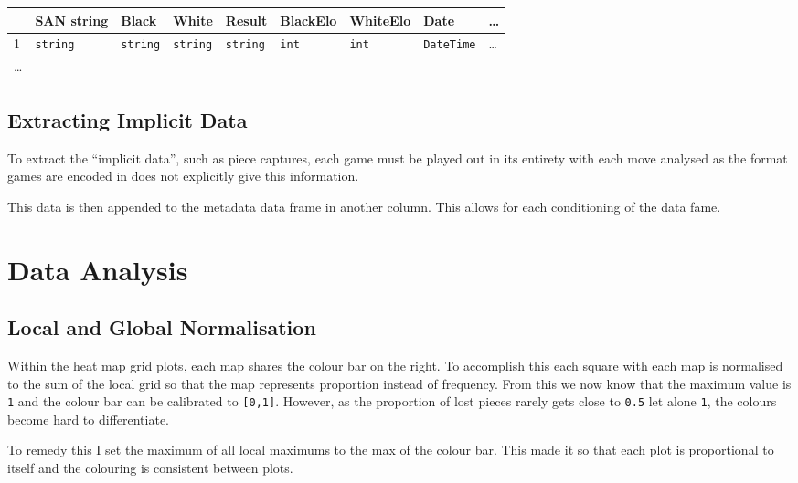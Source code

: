 \documentclass[11pt]{article}
\begin{document}
\begin{center}
\begin{tabular}{lllllllll}
 & SAN string & Black & White & Result & BlackElo & WhiteElo & Date & \ldots{}\\
\hline
1 & \texttt{string} & \texttt{string} & \texttt{string} & \texttt{string} & \texttt{int} & \texttt{int} & \texttt{DateTime} & \ldots{}\\
\ldots{} &  &  &  &  &  &  &  & \\
\end{tabular}
\end{center}

\subsection{Extracting Implicit Data}
\label{sec:org1444c4e}
To extract the ``implicit data'', such as piece captures, each game must be played out in its entirety with each move analysed as the format games are encoded in does not explicitly give this information.

This data is then appended to the metadata data frame in another column. This allows for each conditioning of the data fame.
\section{Data Analysis}
\label{sec:org4fd4c21}
\subsection{Local and Global Normalisation}
\label{sec:orgbfc8a85}
Within the heat map grid plots, each map shares the colour bar on the right. To accomplish this each square with each map is normalised to the sum of the local grid so that the map represents proportion instead of frequency. From this we now know that the maximum value is \texttt{1} and the colour bar can be calibrated to \texttt{[0,1]}. However, as the proportion of lost pieces rarely gets close to \texttt{0.5} let alone \texttt{1}, the colours become hard to differentiate.

To remedy this I set the maximum of all local maximums to the max of the colour bar. This made it so that each plot is proportional to itself and the colouring is consistent between plots.
\end{document}
